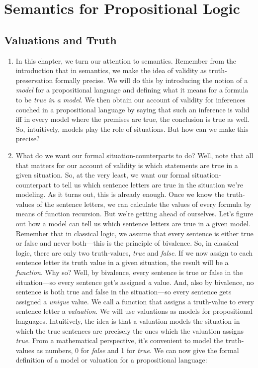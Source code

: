 \chapter{Semantics for Propositional Logic}

\section{Valuations and Truth}

	\begin{enumerate}[\thesection.1]
	
		\item In this chapter, we turn our attention to semantics. Remember from the introduction that in semantics, we make the idea of validity as truth-preservation formally precise. We will do this by introducing the notion of a \emph{model} for a propositional language and defining what it means for a formula to be \emph{true in a model}. We then obtain our account of validity for inferences couched in a propositional language by saying that such an inference is valid iff in every model where the premises are true, the conclusion is true as well. So, intuitively, models play the role of situations. But how can we make this precise?
		
		\item What do we want our formal situation-counterparts to do? Well, note that all that matters for our account of validity is which statements are true in a given situation. So, at the very least, we want our formal situation-counterpart to tell us which sentence letters are true in the situation we're modeling. As it turns out, this is already enough. Once we know the truth-values of the sentence letters, we can calculate the values of every formula by means of function recursion. But we're getting ahead of ourselves.  Let's figure out how a model can tell us which sentence letters are true in a given model. Remember that in classical logic, we assume that every sentence is either true or false and never both---this is the principle of bivalence. So, in classical logic, there are only two truth-values, \emph{true} and \emph{false}. If we now assign to each sentence letter its truth value in a given situation, the result will be a \emph{function}. Why so? Well, by bivalence, every sentence is true or false in the situation---so every sentence get's assigned \emph{a} value. And, also by bivalence, no sentence is both true and false in the situation---so every sentence gets assigned a \emph{unique} value. We call a function that assigns a truth-value to every sentence letter a \emph{valuation}. We will use valuations as models for propositional languages. Intuitively, the idea is that a valuation models the situation in which the true sentences are precisely the ones which the valuation assigns \emph{true}. From a mathematical perspective, it's convenient to model the truth-values as numbers, 0 for \emph{false} and 1 for \emph{true}. We can now give the formal definition of a model or valuation for a propositional language: 
		

\end{enumerate}
